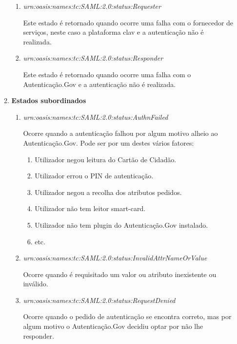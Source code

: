 \begin{enumerate}
\begin{enumerate}
\begin{enumerate}
            \item \emph{urn:oasis:names:tc:SAML:2.0:status:Requester}
            
            Este estado é retornado quando ocorre uma falha com o fornecedor de serviços, neste caso a plataforma \gls{clav} e a autenticação não é realizada.
            
            \item \emph{urn:oasis:names:tc:SAML:2.0:status:Responder}
            
            Este estado é retornado quando ocorre uma falha com o Autenticação.Gov e a autenticação não é realizada.
        \end{enumerate}
        
        \item \textbf{Estados subordinados}
        \begin{enumerate}
            \item \emph{urn:oasis:names:tc:SAML:2.0:status:AuthnFailed}
            
            Ocorre quando a autenticação falhou por algum motivo alheio ao Autenticação.Gov.
            Pode ser por um destes vários fatores:
            
            \begin{enumerate}
                \item Utilizador negou leitura do Cartão de Cidadão.
                \item Utilizador errou o PIN de autenticação.
                \item Utilizador negou a recolha dos atributos pedidos.
                \item Utilizador não tem leitor smart-card.
                \item Utilizador não tem plugin do Autenticação.Gov instalado.
                \item etc.
            \end{enumerate}
            
            \item \emph{urn:oasis:names:tc:SAML:2.0:status:InvalidAttrNameOrValue}
            
            Ocorre quando é requisitado um valor ou atributo inexistente ou inválido.
            
            \item \emph{urn:oasis:names:tc:SAML:2.0:status:RequestDenied}
            
            Ocorre quando o pedido de autenticação se encontra correto, mas por algum motivo o Autenticação.Gov decidiu optar por não lhe responder.
            

\end{enumerate}
\end{enumerate}
\end{enumerate}
